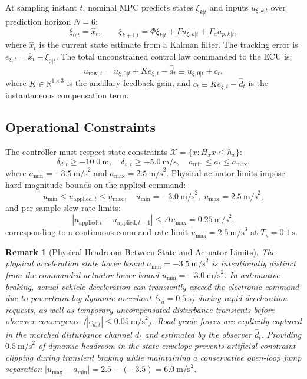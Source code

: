 \documentclass[journal]{IEEEtran}
\newtheorem{remark}{Remark}
\begin{document}
At sampling instant $t$, nominal MPC predicts states $\xi_{k|t}$ and inputs $u_{\xi,k|t}$ over prediction horizon $N = 6$:
\begin{equation}
\xi_{0|t} = \hat x_t, \qquad \xi_{k+1|t} = \Phi \xi_{k|t} + \Gamma u_{\xi,k|t} + \Gamma_a a_{p,k|t},
\end{equation}
where $\hat x_t$ is the current state estimate from a Kalman filter. The tracking error is $e_{\xi,t} = \hat x_t - \xi_{0|t}$. The total unconstrained control law commanded to the ECU is:
\begin{equation}
u_{\mathrm{raw},t} = u_{\xi,0|t} + K e_{\xi,t} - \hat d_t \equiv u_{\xi,0|t} + c_t,
\label{eq:ctrl_law}
\end{equation}
where $K \in \mathbb{R}^{1\times 3}$ is the ancillary feedback gain, and $c_t \equiv K e_{\xi,t} - \hat d_t$ is the instantaneous compensation term.

\subsection{Operational Constraints}

The controller must respect state constraints $\mathcal{X} = \{x : H_x x \le h_x\}$:
\begin{equation}
\delta_{d,t} \ge -10.0~\text{m}, \quad \delta_{v,t} \ge -5.0~\text{m/s}, \quad a_{\min} \le a_t \le a_{\max},
\end{equation}
where $a_{\min} = -3.5~\text{m/s}^2$ and $a_{\max} = 2.5~\text{m/s}^2$. Physical actuator limits impose hard magnitude bounds on the applied command:
\begin{equation}
u_{\min} \le u_{\mathrm{applied},t} \le u_{\max}, \quad u_{\min} = -3.0~\text{m/s}^2, \; u_{\max} = 2.5~\text{m/s}^2,
\end{equation}
and per-sample slew-rate limits:
\begin{equation}
|u_{\mathrm{applied},t} - u_{\mathrm{applied},t-1}| \le \Delta u_{\max} = 0.25~\text{m/s}^2,
\end{equation}
corresponding to a continuous command rate limit $\dot u_{\max} = 2.5~\text{m/s}^3$ at $T_s = 0.1~\text{s}$.

\begin{remark}[Physical Headroom Between State and Actuator Limits]
The physical acceleration state lower bound $a_{\min} = -3.5~\text{m/s}^2$ is intentionally distinct from the commanded actuator lower bound $u_{\min} = -3.0~\text{m/s}^2$. In automotive braking, actual vehicle deceleration can transiently exceed the electronic command due to powertrain lag dynamic overshoot ($\tau_a = 0.5~\text{s}$) during rapid deceleration requests, as well as temporary uncompensated disturbance transients before observer convergence ($|e_{d,t}| \le 0.05~\text{m/s}^2$). Road grade forces are explicitly captured in the matched disturbance channel $d_t$ and estimated by the observer $\hat d_t$. Providing $0.5~\text{m/s}^2$ of dynamic headroom in the state envelope prevents artificial constraint clipping during transient braking while maintaining a conservative open-loop jump separation $|u_{\max} - a_{\min}| = 2.5 - (-3.5) = 6.0~\text{m/s}^2$.
\end{remark}
\end{document}
